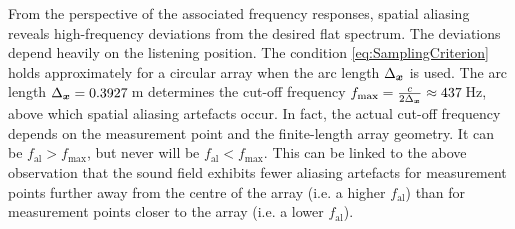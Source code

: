 From the perspective of the associated frequency responses,
spatial aliasing reveals high-frequency deviations from the desired flat spectrum.
The deviations depend heavily on the listening position.
%
The condition \myeq\eqref{eq:SamplingCriterion} holds approximately for a
circular array when the arc length $\Delta_{\bm{x}}$ is used.
The arc length $\Delta_{\bm{x}}=0{.}3927$\,m determines the cut-off frequency
$f_\text{max} = \frac{c}{2 \Delta_{\bm{x}}}\approx 437$\,Hz, above which spatial
aliasing artefacts occur.
%
In fact, the actual cut-off frequency depends on the measurement point
and the finite-length array geometry.
It can be $f_\text{al}>f_\text{max}$, but never will
be $f_\text{al}<f_\text{max}$.
%
This can be linked to the above observation that the sound field exhibits fewer
aliasing artefacts for measurement points further away from the centre of
the array (i.e. a higher $f_\text{al}$) than for measurement points closer to
the array (i.e. a lower $f_\text{al}$).



